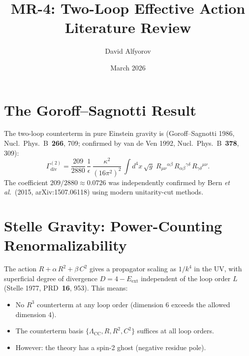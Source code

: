 \documentclass[12pt,a4paper]{article}
\title{\textbf{MR-4: Two-Loop Effective Action\\Literature Review}}
\author{David Alfyorov}
\date{March 2026}
\begin{document}
\maketitle
\begin{center}
\end{center}
\tableofcontents
\newpage

\section{The Goroff--Sagnotti Result}

The two-loop counterterm in pure Einstein gravity is
(Goroff--Sagnotti 1986, Nucl.\ Phys.\ B~\textbf{266}, 709;
confirmed by van de Ven 1992, Nucl.\ Phys.\ B~\textbf{378}, 309):
\begin{equation}
  \Gamma_{\text{div}}^{(2)} = \frac{209}{2880}\,\frac{1}{\epsilon}\,
  \frac{\kappa^2}{(16\pi^2)^2}\,
  \int d^4x\,\sqrt{g}\;
  R_{\mu\nu}{}^{\alpha\beta}\,R_{\alpha\beta}{}^{\gamma\delta}\,
  R_{\gamma\delta}{}^{\mu\nu}.
\end{equation}
The coefficient $209/2880 \approx 0.0726$ was independently confirmed
by Bern \textit{et al.}\ (2015, arXiv:1507.06118) using modern
unitarity-cut methods.

\section{Stelle Gravity: Power-Counting Renormalizability}

The action $R + \alpha\,R^2 + \beta\,C^2$ gives a propagator scaling
as $1/k^4$ in the UV, with superficial degree of divergence
$D = 4 - E_{\text{ext}}$ independent of the loop order $L$
(Stelle 1977, PRD~\textbf{16}, 953). This means:
\begin{itemize}
  \item No $R^3$ counterterm at any loop order (dimension 6 exceeds the
    allowed dimension 4).
  \item The counterterm basis $\{\Lambda_{\text{CC}}, R, R^2, C^2\}$
    suffices at all loop orders.
  \item However: the theory has a spin-2 ghost (negative residue pole).
\end{itemize}
\end{document}
